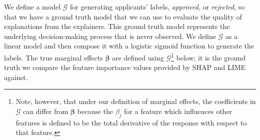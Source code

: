 \documentclass[mnsc,blindrev]{informs3}
\begin{document}
\begin{table}[ht]
\centering
{}
\caption{Description of features for simulated loan data.}
\label{tab:simulated}
\end{table}



   We define a model $\mathcal{G}$ for generating applicants' labels, \textit{approved}, or \textit{rejected}, so that we have a ground truth model that we can use to evaluate the quality of explanations from the explainers. This ground truth model represents the underlying decision-making process that is never observed.  We define $\mathcal{G}$ as a linear model and then compose it with a logistic sigmoid function to generate the labels. The true marginal effects $\boldsymbol{\beta}$ are defined using $\mathcal{G}$\footnote{Note, however, that under our definition of marginal effects, the coefficients in $\mathcal{G}$ can differ from $\boldsymbol{\beta}$ because the $\beta_j$ for a feature which influences other features is defined to be the total derivative of the response with respect to that feature.} below; it is the ground truth we compare the feature importance values provided by SHAP and LIME against.
   
\end{document}
